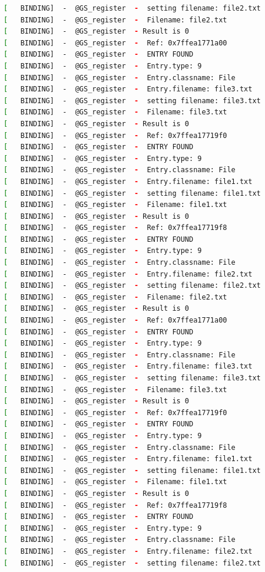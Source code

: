 \begin{lstlisting}[language=bash]
[   BINDING]  -  @GS_register  -  setting filename: file2.txt
[   BINDING]  -  @GS_register  -  Filename: file2.txt
[   BINDING]  -  @GS_register  - Result is 0
[   BINDING]  -  @GS_register  -  Ref: 0x7ffea1771a00
[   BINDING]  -  @GS_register  -  ENTRY FOUND
[   BINDING]  -  @GS_register  -  Entry.type: 9
[   BINDING]  -  @GS_register  -  Entry.classname: File
[   BINDING]  -  @GS_register  -  Entry.filename: file3.txt
[   BINDING]  -  @GS_register  -  setting filename: file3.txt
[   BINDING]  -  @GS_register  -  Filename: file3.txt
[   BINDING]  -  @GS_register  - Result is 0
[   BINDING]  -  @GS_register  -  Ref: 0x7ffea17719f0
[   BINDING]  -  @GS_register  -  ENTRY FOUND
[   BINDING]  -  @GS_register  -  Entry.type: 9
[   BINDING]  -  @GS_register  -  Entry.classname: File
[   BINDING]  -  @GS_register  -  Entry.filename: file1.txt
[   BINDING]  -  @GS_register  -  setting filename: file1.txt
[   BINDING]  -  @GS_register  -  Filename: file1.txt
[   BINDING]  -  @GS_register  - Result is 0
[   BINDING]  -  @GS_register  -  Ref: 0x7ffea17719f8
[   BINDING]  -  @GS_register  -  ENTRY FOUND
[   BINDING]  -  @GS_register  -  Entry.type: 9
[   BINDING]  -  @GS_register  -  Entry.classname: File
[   BINDING]  -  @GS_register  -  Entry.filename: file2.txt
[   BINDING]  -  @GS_register  -  setting filename: file2.txt
[   BINDING]  -  @GS_register  -  Filename: file2.txt
[   BINDING]  -  @GS_register  - Result is 0
[   BINDING]  -  @GS_register  -  Ref: 0x7ffea1771a00
[   BINDING]  -  @GS_register  -  ENTRY FOUND
[   BINDING]  -  @GS_register  -  Entry.type: 9
[   BINDING]  -  @GS_register  -  Entry.classname: File
[   BINDING]  -  @GS_register  -  Entry.filename: file3.txt
[   BINDING]  -  @GS_register  -  setting filename: file3.txt
[   BINDING]  -  @GS_register  -  Filename: file3.txt
[   BINDING]  -  @GS_register  - Result is 0
[   BINDING]  -  @GS_register  -  Ref: 0x7ffea17719f0
[   BINDING]  -  @GS_register  -  ENTRY FOUND
[   BINDING]  -  @GS_register  -  Entry.type: 9
[   BINDING]  -  @GS_register  -  Entry.classname: File
[   BINDING]  -  @GS_register  -  Entry.filename: file1.txt
[   BINDING]  -  @GS_register  -  setting filename: file1.txt
[   BINDING]  -  @GS_register  -  Filename: file1.txt
[   BINDING]  -  @GS_register  - Result is 0
[   BINDING]  -  @GS_register  -  Ref: 0x7ffea17719f8
[   BINDING]  -  @GS_register  -  ENTRY FOUND
[   BINDING]  -  @GS_register  -  Entry.type: 9
[   BINDING]  -  @GS_register  -  Entry.classname: File
[   BINDING]  -  @GS_register  -  Entry.filename: file2.txt
[   BINDING]  -  @GS_register  -  setting filename: file2.txt

\end{lstlisting}
